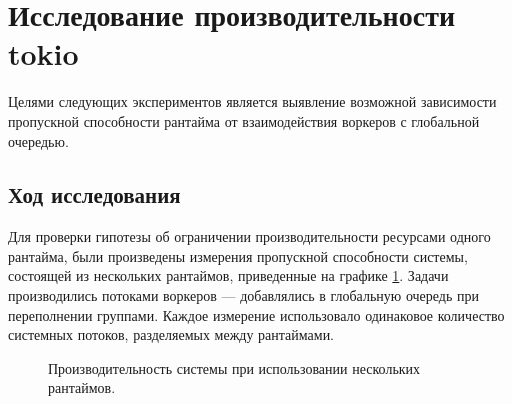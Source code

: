 
\section{Исследование производительности tokio}

Целями следующих экспериментов является выявление возможной зависимости пропускной способности рантайма от взаимодействия воркеров с глобальной очередью.

\subsection{Ход исследования}

Для проверки гипотезы об ограничении производительности ресурсами одного рантайма, были произведены измерения пропускной способности системы, состоящей из нескольких рантаймов, приведенные на графике \ref{fig:tatlin:multi_rt:eval}. Задачи производились потоками воркеров --- добавлялись в глобальную очередь при переполнении группами. Каждое измерение использовало одинаковое количество системных потоков, разделяемых между рантаймами.

\begin{figure}[H]
    \begin{center}
    \end{center}

    \caption{Производительность системы при использовании нескольких рантаймов.}
    \label{fig:tatlin:multi_rt:eval}
\end{figure}

